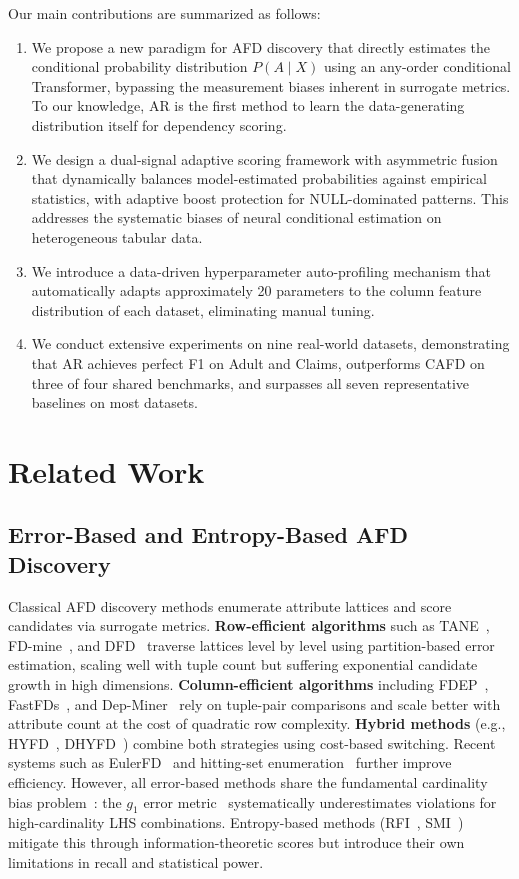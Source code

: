 \documentclass[conference]{IEEEtran}
\begin{document}
Our main contributions are summarized as follows:
\begin{enumerate}
    \item We propose a new paradigm for AFD discovery that directly estimates the conditional probability distribution $P(A \mid X)$ using an any-order conditional Transformer, bypassing the measurement biases inherent in surrogate metrics. To our knowledge, AR is the first method to learn the data-generating distribution itself for dependency scoring.
    \item We design a dual-signal adaptive scoring framework with asymmetric fusion that dynamically balances model-estimated probabilities against empirical statistics, with adaptive boost protection for NULL-dominated patterns. This addresses the systematic biases of neural conditional estimation on heterogeneous tabular data.
    \item We introduce a data-driven hyperparameter auto-profiling mechanism that automatically adapts approximately 20 parameters to the column feature distribution of each dataset, eliminating manual tuning.
    \item We conduct extensive experiments on nine real-world datasets, demonstrating that AR achieves perfect F1 on Adult and Claims, outperforms CAFD on three of four shared benchmarks, and surpasses all seven representative baselines on most datasets.
\end{enumerate}

\section{Related Work}\label{sec:related}

\subsection{Error-Based and Entropy-Based AFD Discovery}
Classical AFD discovery methods enumerate attribute lattices and score candidates via surrogate metrics. \textbf{Row-efficient algorithms} such as TANE~\cite{tane}, FD-mine~\cite{fdmine}, and DFD~\cite{dfd} traverse lattices level by level using partition-based error estimation, scaling well with tuple count but suffering exponential candidate growth in high dimensions. \textbf{Column-efficient algorithms} including FDEP~\cite{fdep}, FastFDs~\cite{fastfd}, and Dep-Miner~\cite{depminer} rely on tuple-pair comparisons and scale better with attribute count at the cost of quadratic row complexity. \textbf{Hybrid methods} (e.g., HYFD~\cite{hyfd}, DHYFD~\cite{dhyfd}) combine both strategies using cost-based switching. Recent systems such as EulerFD~\cite{eulerfd} and hitting-set enumeration~\cite{hittingset} further improve efficiency. However, all error-based methods share the fundamental cardinality bias problem~\cite{measure_study}: the $g_1$ error metric~\cite{g1_error} systematically underestimates violations for high-cardinality LHS combinations. Entropy-based methods (RFI~\cite{rfi}, SMI~\cite{smi}) mitigate this through information-theoretic scores but introduce their own limitations in recall and statistical power.
\end{document}
